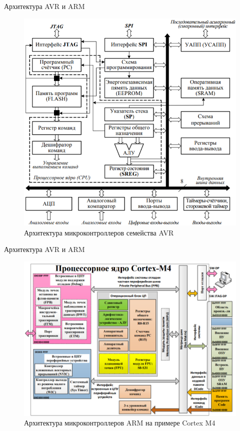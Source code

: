 \documentclass[12pt,a4paper,mathserif]{beamer}
\begin{document}
\begin{frame}{Архитектура AVR и ARM}
    \setlength{\parindent}{0.5cm}
    \begin{figure}
        \centering
        \includegraphics[scale=0.44]{Architecture_AVR.png}
        \caption{Архитектура микроконтроллеров семейства AVR}
        \label{fig:arch_AVR}
    \end{figure}
\end{frame}

\begin{frame}{Архитектура AVR и ARM}
    \begin{figure}
        \centering
        \includegraphics[scale=0.45]{Architecture_ARM.png}
        \caption{Архитектура микроконтроллеров ARM на примере Cortex M4}
        \label{fig:arch_ARM}
    \end{figure}
\end{frame}
\end{document}
